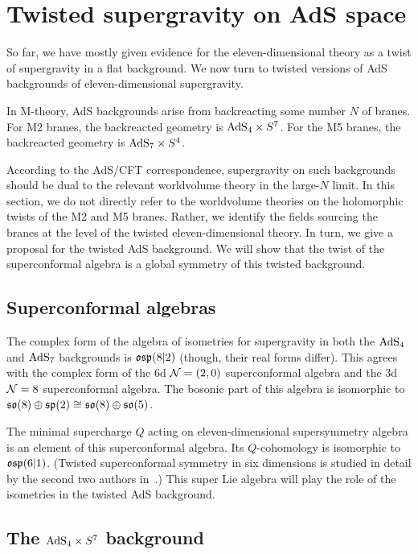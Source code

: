 \section{Twisted supergravity on AdS space}
\label{sec:ads}

So far, we have mostly given evidence for the eleven-dimensional theory as a twist of supergravity in a flat background. 
We now turn to twisted versions of AdS backgrounds of eleven-dimensional supergravity. 

In M-theory, AdS backgrounds arise from backreacting some number $N$ of branes. 
For M2 branes, the backreacted geometry is ${\rm AdS}_4 \times S^7$.
For the M5 branes, the backreacted geometry is ${\rm AdS}_7 \times S^4$. 

According to the AdS/CFT correspondence, supergravity on such backgrounds should be dual to the relevant worldvolume theory in the large-$N$ limit. 
In this section, we do not directly refer to the worldvolume theories on the holomorphic twists of the M2 and M5 branes.
Rather, we identify the fields sourcing the branes at the level of the twisted eleven-dimensional theory.
In turn, we give a proposal for the twisted AdS background. 
We will show that the twist of the superconformal algebra is a global symmetry of this twisted background. 

\subsection{Superconformal algebras}

The complex form of the algebra of isometries for supergravity in both the ${\rm AdS}_4$ and ${\rm AdS}_7$ backgrounds is $\mathfrak{osp}(8|2)$ (though, their real forms differ). 
This agrees with the complex form of the 6d $\mathcal N=(2,0)$ superconformal algebra and the 3d $\mathcal N=8$ superconformal algebra. 
The bosonic part of this algebra is isomorphic to $\mathfrak{so}(8) \oplus \mathfrak{sp}(2) \cong \mathfrak{so}(8) \oplus \mathfrak{so}(5)$. 

The minimal supercharge $Q$ acting on eleven-dimensional supersymmetry algebra is an element of this superconformal algebra. 
Its $Q$-cohomology is isomorphic to $\mathfrak{osp}(6|1)$. (Twisted superconformal symmetry in six dimensions is studied in detail by the second  two authors  in~\cite{SWsuco2}.)
This super Lie algebra will play the role of the isometries in the twisted AdS background. 

\subsection{The ${\rm AdS}_4 \times S^7$ background}

